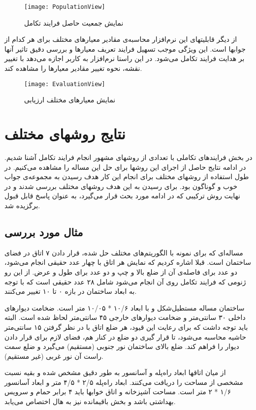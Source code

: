 \documentclass{report}
\begin{document}
\begin{figure} \centerline{\texttt{[image: PopulationView]}} \caption{\label{fPopulationView}
نمایش جمعیت حاصل فرایند تکامل
 } \end{figure}
 
 از دیگر قابلیتهای این نرم‌افزار محاسبه‌ی مقادیر معیارهای مختلف برای هر کدام از جوابها است. این ویژگی موجب تسهیل فرایند تعریف معیارها و بررسی دقیق تاثیر آنها بر هدایت فرایند تکامل می‌شود. در این راستا نرم‌افزار به کاربر اجازه می‌دهد با تغییر نقشه، نحوه تغییر مقادیر معیارها را مشاهده کند.
 
 \begin{figure} \centerline{\texttt{[image: EvaluationView]}} \caption{\label{fEvaluationView}
نمایش معیارهای مختلف ارزیابی
 } \end{figure}

\section{نتایج روشهای مختلف}
در بخش فرایندهای تکاملی با تعدادی از روشهای مشهور انجام فرایند تکامل آشنا شدیم. در ادامه نتایج حاصل از اجرای این روشها برای حل این مساله را مشاهده می‌کنیم. در طول استفاده از روشهای مختلف برای انجام این کار هدف رسیدن به مجموعه‌ی جواب خوب و گوناگون بود. برای رسیدن به این هدف روشهای مختلف بررسی شدند و در نهایت روش ترکیبی که در ادامه مورد بحث قرار می‌گیرد، به عنوان پاسخ قابل قبول برگزیده شد. 

\subsection{مثال مورد بررسی}
مساله‌ای که برای نمونه با الگوریتم‌های مختلف حل شده، قرار دادن ۷ اتاق در فضای ساختمان است. قبلا اشاره کردیم که نمایش هر اتاق با چهار عدد حقیقی انجام می‌شود، دو عدد برای فاصله‌ی آن از ضلع بالا و چپ و دو عدد برای طول و عرض. از این رو ژنومی که فرایند تکامل روی آن انجام می‌شود شامل ۲۸ عدد حقیقی است که با توجه به ابعاد ساختمان در بازه ۰ تا ۱۰ تغییر می‌کنند.

ساختمان مساله مستطیل‌شکل و با ابعاد ۱۰/۶ * ۱۰/۰۵ متر است. ضخامت دیوارهای داخلی ۳۰ سانتی‌متر و ضخامت دیوارهای خارجی ۴۵ سانتی‌متر لحاظ شده است. البته باید توجه داشت که برای رعایت این قیود، هر ضلع اتاق با در نظر گرفتن ۱۵ سانتی‌متر حاشیه محاسبه می‌شود، تا قرار گیری دو ضلع در کنار هم، فضای لازم برای قرار دادن دیوار را فراهم کند. ضلع بالای ساختمان نور جنوبی (مستقیم) می‌گیرد و ضلع سمت راست آن نور غربی (غیر مستقیم).

از میان اتاقها ابعاد راه‌پله و آسانسور به طور دقیق مشخص شده و بقیه نسبت مشخصی از مساحت را دریافت می‌کنند. ابعاد راه‌پله ۲/۵ * ۴/۵ متر و ابعاد آسانسور ۱/۶ *‌ ۲ متر است. مساحت آشپزخانه و اتاق خوابها باید ۴ برابر حمام و سرویس بهداشتی باشد و بخش باقیمانده نیز به هال اختصاص می‌یابد.
\end{document}
